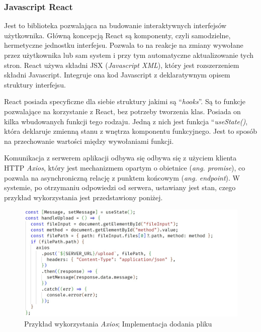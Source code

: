 \documentclass[12pt,a4paper,twoside]{article}
\begin{document}
\subsubsection{Javascript React}
Jest to biblioteka pozwalająca na budowanie interaktywnych interfejsów użytkownika. Główną koncepcją React są komponenty, czyli samodzielne, hermetyczne jednostku interfejsu. Pozwala to na reakcje na zmiany wywołane przez użytkownika lub sam system i przy tym automatyczne aktualizowanie tych stron. React używa składni JSX (\textit{Javascript XML}), który jest rozszerzeniem składni Javascript. Integruje ona kod Javascript z deklaratywnym opisem struktury interfejsu.\par
React posiada specyficzne dla siebie struktury jakimi są ``\textit{hooks}''. Są to funkcje pozwalające na korzystanie z React, bez potrzeby tworzenia klas. Posiada on kilka wbudowanych funkcji tego rodzaju. Jedną z nich jest funkcja ``\textit{useState()}, która deklaruje zmienną stanu z wnętrza komponentu funkcyjnego. Jest to sposób na przechowanie wartości między wywołaniami funkcji. \par
Komunikacja z serwerem aplikacji odbywa się odbywa się z użyciem klienta HTTP \textit{Axios}, który jest mechanizmem opartym o obietnice (\textit{ang. promise}), co pozwala na asynchroniczną relację z punktem końcowym (\textit{ang. endpoint}). W systemie, po otrzymaniu odpowiedzi od serwera, ustawiany jest stan, czego przykład wykorzystania jest przedstawiony poniżej.
\begin{figure}[h!]
\centering
  \includegraphics[width=\textwidth]{img/axios.jpg}
  \caption{Przykład wykorzystania \textit{Axios}; Implementacja dodania pliku}
\end{figure}
\end{document}
